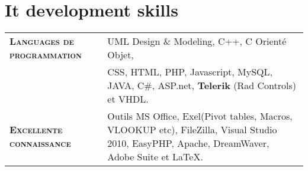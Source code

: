\documentclass[a4paper,10pt]{article}
\newcommand*{\authorimg}[1]{%
  \raisebox{-0.1\baselineskip}{%
    \texttt{[image: \#1]}%
  }%
}
\begin{document}
% 
% 
% 
\begin{minipage}[t]{0.43\textwidth}
\section{\LARGE{{It development skills} }}

\begin{tabularx}{1\linewidth}{>{\raggedright\scshape}p{2.5cm}X}
 
\textbf{{Languages de} {programmation}}&	UML Design \& Modeling, C++, C Orient\'e Objet,  \\ & CSS, HTML, PHP, Javascript, MySQL, JAVA, C\#, ASP.net, \textbf{Telerik} (Rad Controls) et VHDL.\\
\textbf{{Excellente connaissance}}   & Outils MS Office, Exel(Pivot tables, Macros, VLOOKUP etc), FileZilla,  Visual Studio 2010, EasyPHP, Apache, DreamWaver, Adobe Suite et \LaTeX. \\
\end{tabularx}


\end{minipage} 
\end{document}
